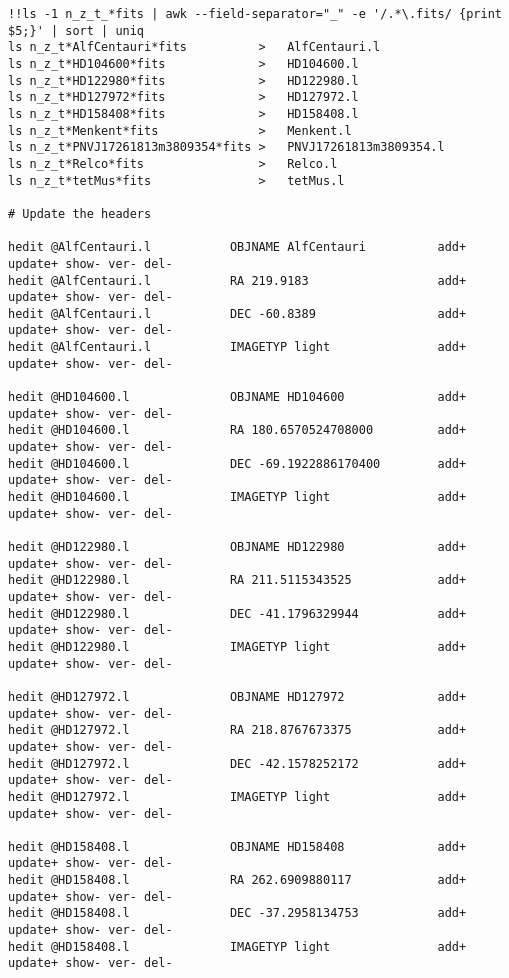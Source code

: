 \begin{verbatim}
!!ls -1 n_z_t_*fits | awk --field-separator="_" -e '/.*\.fits/ {print $5;}' | sort | uniq
ls n_z_t*AlfCentauri*fits          >   AlfCentauri.l
ls n_z_t*HD104600*fits             >   HD104600.l
ls n_z_t*HD122980*fits             >   HD122980.l
ls n_z_t*HD127972*fits             >   HD127972.l
ls n_z_t*HD158408*fits             >   HD158408.l
ls n_z_t*Menkent*fits              >   Menkent.l
ls n_z_t*PNVJ17261813m3809354*fits >   PNVJ17261813m3809354.l
ls n_z_t*Relco*fits                >   Relco.l
ls n_z_t*tetMus*fits               >   tetMus.l

# Update the headers

hedit @AlfCentauri.l           OBJNAME AlfCentauri          add+ update+ show- ver- del-
hedit @AlfCentauri.l           RA 219.9183                  add+ update+ show- ver- del-
hedit @AlfCentauri.l           DEC -60.8389                 add+ update+ show- ver- del-
hedit @AlfCentauri.l           IMAGETYP light               add+ update+ show- ver- del-

hedit @HD104600.l              OBJNAME HD104600             add+ update+ show- ver- del-
hedit @HD104600.l              RA 180.6570524708000         add+ update+ show- ver- del-
hedit @HD104600.l              DEC -69.1922886170400        add+ update+ show- ver- del-
hedit @HD104600.l              IMAGETYP light               add+ update+ show- ver- del-

hedit @HD122980.l              OBJNAME HD122980             add+ update+ show- ver- del-
hedit @HD122980.l              RA 211.5115343525            add+ update+ show- ver- del-
hedit @HD122980.l              DEC -41.1796329944           add+ update+ show- ver- del-
hedit @HD122980.l              IMAGETYP light               add+ update+ show- ver- del-

hedit @HD127972.l              OBJNAME HD127972             add+ update+ show- ver- del-
hedit @HD127972.l              RA 218.8767673375            add+ update+ show- ver- del-
hedit @HD127972.l              DEC -42.1578252172           add+ update+ show- ver- del-
hedit @HD127972.l              IMAGETYP light               add+ update+ show- ver- del-

hedit @HD158408.l              OBJNAME HD158408             add+ update+ show- ver- del-
hedit @HD158408.l              RA 262.6909880117            add+ update+ show- ver- del-
hedit @HD158408.l              DEC -37.2958134753           add+ update+ show- ver- del-
hedit @HD158408.l              IMAGETYP light               add+ update+ show- ver- del-


\end{verbatim}
